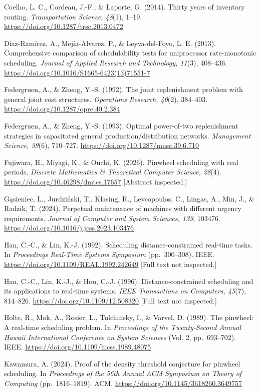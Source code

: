 \documentclass[
  british,
  11pt,
  a4paper,
]{article}
\begin{document}
Coelho, L. C., Cordeau, J.-F., \& Laporte, G. (2014). Thirty years of
inventory routing. \emph{Transportation Science, 48}(1), 1--19.
\url{https://doi.org/10.1287/trsc.2013.0472}

Díaz-Ramírez, A., Mejía-Alvarez, P., \& Leyva-del-Foyo, L. E. (2013).
Comprehensive comparison of schedulability tests for uniprocessor
rate-monotonic scheduling. \emph{Journal of Applied Research and
Technology, 11}(3), 408--436.
\url{https://doi.org/10.1016/S1665-6423(13)71551-7}

Federgruen, A., \& Zheng, Y.-S. (1992). The joint replenishment problem
with general joint cost structures. \emph{Operations Research, 40}(2),
384--403. \url{https://doi.org/10.1287/opre.40.2.384}

Federgruen, A., \& Zheng, Y.-S. (1993). Optimal power-of-two
replenishment strategies in capacitated general production/distribution
networks. \emph{Management Science, 39}(6), 710--727.
\url{https://doi.org/10.1287/mnsc.39.6.710}

Fujiwara, H., Miyagi, K., \& Ouchi, K. (2026). Pinwheel scheduling with
real periods. \emph{Discrete Mathematics \& Theoretical Computer
Science, 28}(4). \url{https://doi.org/10.46298/dmtcs.17657} {[}Abstract
inspected.{]}

Gąsieniec, L., Jurdziński, T., Klasing, R., Levcopoulos, C., Lingas, A.,
Min, J., \& Radzik, T. (2024). Perpetual maintenance of machines with
different urgency requirements. \emph{Journal of Computer and System
Sciences, 139}, 103476. \url{https://doi.org/10.1016/j.jcss.2023.103476}

Han, C.-C., \& Lin, K.-J. (1992). Scheduling distance-constrained
real-time tasks. In \emph{Proceedings Real-Time Systems Symposium}
(pp.~300--308). IEEE. \url{https://doi.org/10.1109/REAL.1992.242649}
{[}Full text not inspected.{]}

Han, C.-C., Lin, K.-J., \& Hou, C.-J. (1996). Distance-constrained
scheduling and its applications to real-time systems. \emph{IEEE
Transactions on Computers, 45}(7), 814--826.
\url{https://doi.org/10.1109/12.508320} {[}Full text not inspected.{]}

Holte, R., Mok, A., Rosier, L., Tulchinsky, I., \& Varvel, D. (1989).
The pinwheel: A real-time scheduling problem. In \emph{Proceedings of
the Twenty-Second Annual Hawaii International Conference on System
Sciences} (Vol. 2, pp.~693--702). IEEE.
\url{https://doi.org/10.1109/hicss.1989.48075}

Kawamura, A. (2024). Proof of the density threshold conjecture for
pinwheel scheduling. In \emph{Proceedings of the 56th Annual ACM
Symposium on Theory of Computing} (pp.~1816--1819). ACM.
\url{https://doi.org/10.1145/3618260.3649757}
\end{document}
